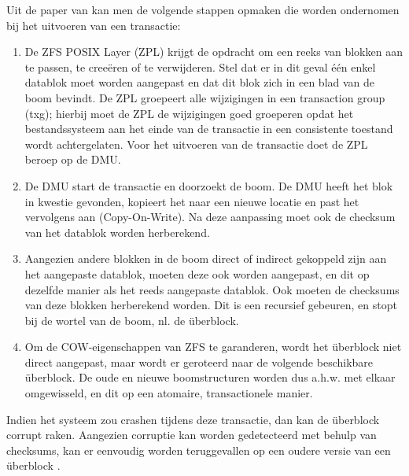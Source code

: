 Uit de paper van \textcite{ZFSBonwick} kan men de volgende stappen opmaken die worden ondernomen bij het uitvoeren van een transactie:

\begin{enumerate}
  \item{De ZFS POSIX Layer (ZPL) krijgt de opdracht om een reeks van blokken aan te passen, te creeëren of te verwijderen. Stel dat er in dit geval één enkel datablok moet worden aangepast en dat dit blok zich in een blad van de boom bevindt. De ZPL groepeert alle wijzigingen in een transaction group (txg); hierbij moet de ZPL de wijzigingen goed groeperen opdat het bestandssysteem aan het einde van de transactie in een consistente toestand wordt achtergelaten. Voor het uitvoeren van de transactie doet de ZPL beroep op de DMU.}
  \item{De DMU start de transactie en doorzoekt de boom. De DMU heeft het blok in kwestie gevonden, kopieert het naar een nieuwe locatie en past het vervolgens aan (Copy-On-Write). Na deze aanpassing moet ook de \gls{checksum} van het datablok worden herberekend.}
  \item{Aangezien andere blokken in de boom direct of indirect gekoppeld zijn aan het aangepaste datablok, moeten deze ook worden aangepast, en dit op dezelfde manier als het reeds aangepaste datablok. Ook moeten de checksums van deze blokken herberekend worden. Dit is een recursief gebeuren, en stopt bij de wortel van de boom, nl. de \"{u}berblock. }
  \item{Om de COW-eigenschappen van ZFS te garanderen, wordt het \"{u}berblock niet direct aangepast, maar wordt er geroteerd naar de volgende beschikbare \"{u}berblock. De oude en nieuwe boomstructuren worden dus a.h.w. met elkaar omgewisseld, en dit op een atomaire, transactionele manier.}
\end{enumerate}

Indien het systeem zou crashen tijdens deze transactie, dan kan de \"{u}berblock corrupt raken. Aangezien corruptie kan worden gedetecteerd met behulp van checksums, kan er eenvoudig worden teruggevallen op een oudere versie van een \"{u}berblock \autocite{ZFSBonwick}.


